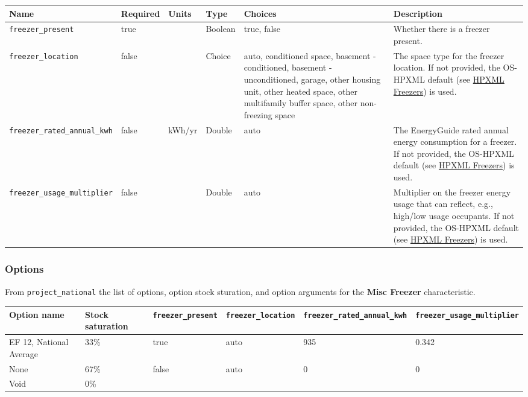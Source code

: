 \begin{longtable}[]{@{}llllll@{}}
\toprule\noalign{}
Name & Required & Units & Type & Choices & Description \\
\midrule\noalign{}
\endhead
\bottomrule\noalign{}
\endlastfoot
\texttt{freezer\_present} & true & & Boolean & true, false & Whether
there is a freezer present. \\
\texttt{freezer\_location} & false & & Choice & auto, conditioned space,
basement - conditioned, basement - unconditioned, garage, other housing
unit, other heated space, other multifamily buffer space, other
non-freezing space & The space type for the freezer location. If not
provided, the OS-HPXML default (see
\href{https://openstudio-hpxml.readthedocs.io/en/v1.7.0/workflow_inputs.html\#hpxml-freezers}{HPXML
Freezers}) is used. \\
\texttt{freezer\_rated\_annual\_kwh} & false & kWh/yr & Double & auto &
The EnergyGuide rated annual energy consumption for a freezer. If not
provided, the OS-HPXML default (see
\href{https://openstudio-hpxml.readthedocs.io/en/v1.7.0/workflow_inputs.html\#hpxml-freezers}{HPXML
Freezers}) is used. \\
\texttt{freezer\_usage\_multiplier} & false & & Double & auto &
Multiplier on the freezer energy usage that can reflect, e.g., high/low
usage occupants. If not provided, the OS-HPXML default (see
\href{https://openstudio-hpxml.readthedocs.io/en/v1.7.0/workflow_inputs.html\#hpxml-freezers}{HPXML
Freezers}) is used. \\
\end{longtable}

\subsubsection{Options}\label{options-115}

From \texttt{project\_national} the list of options, option stock
sturation, and option arguments for the \textbf{Misc Freezer}
characteristic.

\begin{longtable}[]{@{}llllll@{}}
\toprule\noalign{}
Option name & Stock saturation & \texttt{freezer\_present} &
\texttt{freezer\_location} & \texttt{freezer\_rated\_annual\_kwh} &
\texttt{freezer\_usage\_multiplier} \\
\midrule\noalign{}
\endhead
\bottomrule\noalign{}
\endlastfoot
EF 12, National Average & 33\% & true & auto & 935 & 0.342 \\
None & 67\% & false & auto & 0 & 0 \\
Void & 0\% & & & & \\
\end{longtable}

